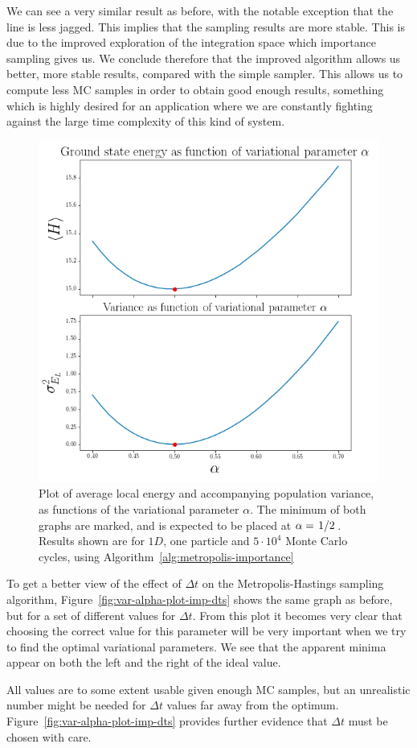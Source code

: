 \documentclass[a4paper, 11pt]{article}
\begin{document}
\begin{multicols}{2}
We can see a very similar result as before, with the notable exception that the
line is less jagged. This implies that the sampling results are more stable.
This is due to the improved exploration of the integration space which
importance sampling gives us. We conclude therefore that the improved algorithm
allows us better, more stable results, compared with the simple sampler. This
allows us to compute less MC samples in order to obtain good enough results,
something which is highly desired for an application where we are constantly
fighting against the large time complexity of this kind of system.

\end{multicols}
\begin{figure}[!h]
    \centering
    \includegraphics[width=0.9\linewidth]{../results/var-alpha-plot-imp-50000.png}
    \caption{Plot of average local energy and accompanying population variance,
    as functions of the variational parameter $\alpha$. The minimum of both
    graphs are marked, and is expected to be placed at
    $\alpha=\flatfrac{1}{2}$. Results shown are for $1D$, one particle and
    $5\cdot 10^{4}$ Monte Carlo cycles, using
    Algorithm~\ref{alg:metropolis-importance}}
    \label{fig:var-alpha-plot-imp}
\end{figure}
\begin{multicols}{2}


To get a better view of the effect of $\Delta t$ on the Metropolis-Hastings
sampling algorithm, Figure~\ref{fig:var-alpha-plot-imp-dts} shows the same graph
as before, but for a set of different values for $\Delta t$. From this plot it
becomes very clear that choosing the correct value for this parameter will be
very important when we try to find the optimal variational parameters. We see
that the apparent minima appear on both the left and the right of the ideal
value. 

All values are to some extent usable given enough MC samples, but an unrealistic
number might be needed for $\Delta t$ values far away from the optimum.
Figure~\ref{fig:var-alpha-plot-imp-dts} provides further evidence that $\Delta
t$ must be chosen with care.
\end{multicols}
\end{document}
